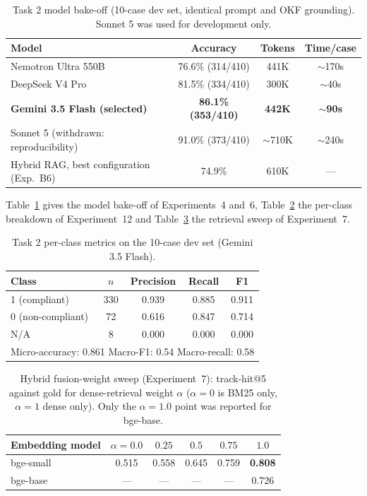 \begin{table}[h]
\caption{Task 2 model bake-off (10-case dev set, identical prompt and OKF grounding). Sonnet 5 was used for development only.}\label{tab:t2-bakeoff}
\centering
\small
\begin{tabular}{lccc}
\toprule
Model & Accuracy & Tokens & Time/case \\
\midrule
Nemotron Ultra 550B & 76.6\% (314/410) & 441K & $\sim$170s \\
DeepSeek V4 Pro & 81.5\% (334/410) & 300K & $\sim$40s \\
\textbf{Gemini 3.5 Flash (selected)} & \textbf{86.1\% (353/410)} & \textbf{442K} & \textbf{$\sim$90s} \\
Sonnet 5 (withdrawn: reproducibility) & 91.0\% (373/410) & $\sim$710K & $\sim$240s \\
\midrule
Hybrid RAG, best configuration (Exp.~B6) & 74.9\% & 610K & --- \\
\bottomrule
\end{tabular}
\end{table}

Table~\ref{tab:t2-bakeoff} gives the model bake-off of Experiments~4 and~6,
Table~\ref{tab:t2-perclass} the per-class breakdown of Experiment~12 and
Table~\ref{tab:t2-fusion} the retrieval sweep of Experiment~7.

\begin{table}
\caption{Task 2 per-class metrics on the 10-case dev set (Gemini 3.5 Flash).}\label{tab:t2-perclass}
\centering
\begin{tabular}{|l|c|c|c|c|}
\hline
Class & $n$ & Precision & Recall & F1 \\
\hline
1 (compliant) & 330 & 0.939 & 0.885 & 0.911 \\
0 (non-compliant) & 72 & 0.616 & 0.847 & 0.714 \\
N/A & 8 & 0.000 & 0.000 & 0.000 \\
\hline
\multicolumn{5}{|l|}{Micro-accuracy: 0.861 \quad Macro-F1: 0.54 \quad Macro-recall: 0.58} \\
\hline
\end{tabular}
\end{table}

\begin{table}[h]
\caption{Hybrid fusion-weight sweep (Experiment~7): track-hit@5 against gold for
dense-retrieval weight $\alpha$ ($\alpha=0$ is BM25 only, $\alpha=1$ dense only). Only
the $\alpha=1.0$ point was reported for bge-base.}
\label{tab:t2-fusion}
\centering
\small
\begin{tabular}{lccccc}
\toprule
Embedding model & $\alpha=0.0$ & $0.25$ & $0.5$ & $0.75$ & $1.0$ \\
\midrule
bge-small & 0.515 & 0.558 & 0.645 & 0.759 & \textbf{0.808} \\
bge-base & --- & --- & --- & --- & 0.726 \\
\bottomrule
\end{tabular}
\end{table}

